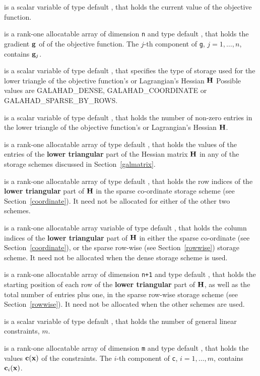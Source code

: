 \documentclass{galahad}
\newcommand{\sym}{\sf\small}
\begin{document}
\begin{description}
 is a scalar variable of type default \realdp,
that holds the current value of the objective function.

 is a rank-one allocatable array of dimension {\tt n} and type
default \realdp, that holds the gradient ${\mathbf{g}}$
of of the objective function.
The $j$-th component of
{\tt g}, $j = 1,  \ldots ,  n$, contains ${\mathbf{g}}_{j}$.

 is a scalar variable of type default \integer,
that specifies the type of storage used for the lower triangle of the
objective function's or Lagrangian's Hessian ${\mathbf{H}}$
Possible values are {\sym GALAHAD\_DENSE}, {\sym GALAHAD\_COORDINATE}
or {\sym GALAHAD\_SPARSE\_BY\_ROWS}.

 is a scalar variable of type default \integer,
that holds the number of non-zero entries in the lower triangle of the
objective function's or Lagrangian's Hessian ${\mathbf{H}}$.

 is a rank-one allocatable array of type default \realdp, that holds
the values of the entries of the {\bf lower triangular} part
of the Hessian matrix ${\mathbf{H}}$ in any of the
storage schemes discussed in Section~\ref{galmatrix}.

 is a rank-one allocatable array of type default \integer,
that holds the row indices of the {\bf lower triangular} part of ${\mathbf{H}}$
in the sparse co-ordinate storage
scheme (see Section~\ref{coordinate}).
It need not be allocated for either of the other two schemes.

 is a rank-one allocatable array variable of type default \integer,
that holds the column indices of the {\bf lower triangular} part of
${\mathbf{H}}$ in either the sparse co-ordinate
(see Section~\ref{coordinate}), or the sparse row-wise
(see Section~\ref{rowwise}) storage scheme.
It need not be allocated when the dense storage scheme is used.

 is a rank-one allocatable array of dimension {\tt n+1} and type
default \integer, that holds the starting position of
each row of the {\bf lower triangular} part of ${\mathbf{H}}$, as well
as the total number of entries plus one, in the sparse row-wise storage
scheme (see Section~\ref{rowwise}). It need not be allocated when the
other schemes are used.

 is a scalar variable of type default \integer,
 that holds the number of general linear constraints, $m$.

 is a rank-one allocatable array of dimension {\tt m} and type default
\realdp, that holds
the values ${\mathbf{c}}({\mathbf{x}} )$ of the constraints.
The $i$-th component of {\tt c}, $i = 1,  \ldots ,  m$, contains
${\mathbf{c}}_{i}({\mathbf{x}})$.


\end{description}
\end{document}
